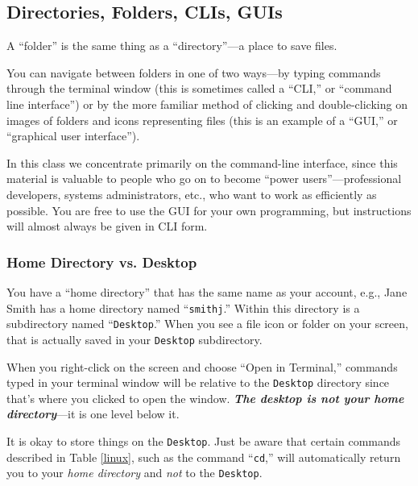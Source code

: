 


\vspace{-0.1in}
\subsection*{Directories, Folders, CLIs, GUIs}
\vspace{-0.1in}
A ``folder'' is the same thing as a ``directory''---a place to save
files. 

\noindent You can navigate
between folders in one of two ways---by typing commands through the
terminal window (this is sometimes called a ``CLI,'' or ``command line
interface'') or by the more familiar method of clicking and double-clicking
on images of folders and icons representing files (this is an example of
a ``GUI,'' or ``graphical user interface''). 

\noindent In this class we concentrate primarily on the command-line interface, since
this material is valuable to people who go on to become 
``power users''---professional
developers, systems administrators, etc., who want to work as
efficiently as possible. You are free to use the GUI
for your own programming, but instructions will almost always
be given in CLI form.

\vspace{-0.1in}
\subsubsection*{Home Directory vs. Desktop}
\vspace{-0.1in}
You have a ``home
directory'' that has the same name as your account, e.g., Jane Smith has
a home directory named ``{\tt smithj}.'' Within this directory is
a subdirectory named ``{\tt Desktop}.'' When you see a file icon or folder
on your screen, that is actually saved in your {\tt Desktop}
subdirectory.

\noindent When you right-click on the screen and choose ``Open in Terminal,'' commands
typed in your
terminal window will be relative to the {\tt Desktop} directory since that's 
where you clicked to open the window. \textbf{\textit{The desktop is 
{\em not} your home directory}}---it is one 
level below it.

\noindent It is okay to store things on the {\tt Desktop}. Just be aware that certain
commands described in Table \ref{linux}, such as the command ``{\tt cd},'' 
will automatically return you to your {\em home directory}
and {\em not} to the {\tt Desktop}.


